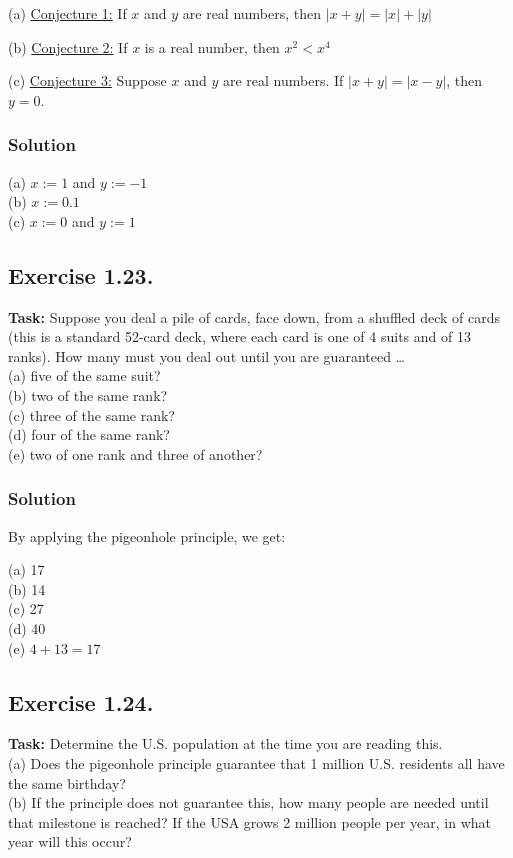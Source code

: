 \documentclass{article}
\begin{document}
\noindent (a) \underline{Conjecture 1:} If $x$ and $y$ are real numbers, then $\lvert x + y \rvert = \lvert x \rvert + \lvert y \rvert$

\noindent (b) \underline{Conjecture 2:} If $x$ is a real number, then $x^2 < x^4$

\noindent (c) \underline{Conjecture 3:} Suppose $x$ and $y$ are real numbers. If $\lvert x + y \rvert = \lvert x - y \rvert$, then $y = 0$. 
 
\subsubsection*{Solution}

(a) $x := 1$ and $y:= -1$\\
(b) $x:= 0.1$\\
(c) $x := 0$ and $y:= 1$

\subsection{Exercise 1.23.} 
\textbf{Task:} Suppose you deal a pile of cards, face down, from a shuffled deck of cards (this is a standard 52-card deck, where each card is one of 4 suits and of 13 ranks). How many must you deal out until you are guaranteed \dots\\

\noindent (a) five of the same suit?\\
(b) two of the same rank?\\
(c) three of the same rank?\\
(d) four of the same rank?\\
(e) two of one rank and three of another?

\subsubsection*{Solution}

By applying the pigeonhole principle, we get:

\noindent(a) 17\\
(b) 14\\
(c) 27\\
(d) 40\\
(e) $4 + 13 = 17$\\

\newpage

\subsection{Exercise 1.24.} 
\textbf{Task:} Determine the U.S. population at the time you are reading this.\\
(a) Does the pigeonhole principle guarantee that 1 million U.S. residents all have the same birthday?\\
(b) If the principle does not guarantee this, how many people are needed until that milestone is reached? If the USA grows 2 million people per year, in what year will this occur?
\end{document}
